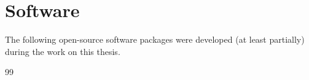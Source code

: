 \chapter*{Software}
The following open-source software packages were developed (at least partially) during the work
on this thesis.

\begin{refsection}[ownsoft]
    \small
    \nocite{*} %
    { %
      \expandafter\def\csname blx@maxbibnames\endcsname{99}%
      \printbibliography[heading=none]
    }
\end{refsection}
